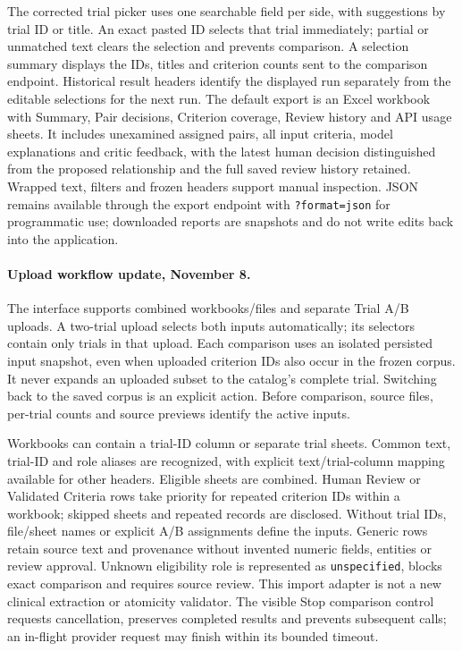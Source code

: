 \documentclass[10pt,letterpaper]{article}
\newcommand{\pathcode}[1]{\nolinkurl{#1}}
\begin{document}
The corrected trial picker uses one searchable field per side, with suggestions
by trial ID or title. An exact pasted ID selects that trial immediately;
partial or unmatched text clears the selection and prevents comparison.
A selection summary displays the IDs, titles and criterion counts sent to the
comparison endpoint. Historical result headers identify the displayed run
separately from the editable selections for the next run.
The default export is an Excel workbook with Summary, Pair decisions,
Criterion coverage, Review history and API usage sheets. It includes unexamined assigned
pairs, all input criteria, model explanations and critic feedback, with the
latest human decision distinguished from the proposed relationship and the
full saved review history retained. Wrapped text, filters and frozen headers
support manual inspection. JSON remains available through the export endpoint
with \pathcode{?format=json} for programmatic use; downloaded reports are
snapshots and do not write edits back into the application.


\paragraph{Upload workflow update, November 8.}
The interface supports combined workbooks/files and separate Trial A/B uploads.
A two-trial upload selects both inputs automatically; its selectors contain
only trials in that upload. Each comparison uses an isolated persisted input
snapshot, even when uploaded criterion IDs also occur in the frozen corpus.
It never expands an uploaded subset to the catalog's complete trial. Switching
back to the saved corpus is an explicit action. Before comparison, source files,
per-trial counts and source previews identify the active inputs.

Workbooks can contain a trial-ID column or separate trial sheets. Common text,
trial-ID and role aliases are recognized, with explicit text/trial-column mapping
available for other headers. Eligible sheets are combined. Human Review or Validated Criteria rows take
priority for repeated criterion IDs within a workbook; skipped sheets and
repeated records are disclosed. Without trial IDs, file/sheet names
or explicit A/B assignments define the inputs. Generic rows retain source text
and provenance without invented numeric fields, entities or review approval.
Unknown eligibility role is represented as \pathcode{unspecified}, blocks exact
comparison and requires source review. This import adapter is not a new clinical
extraction or atomicity validator. The visible Stop comparison control requests
cancellation, preserves completed results and prevents subsequent calls; an
in-flight provider request may finish within its bounded timeout.
\end{document}
